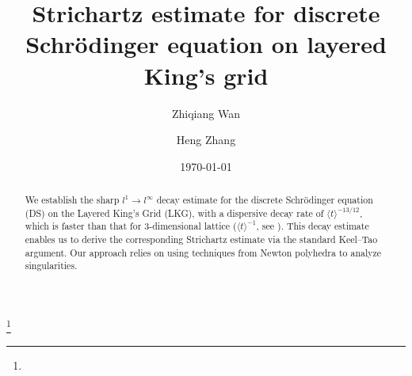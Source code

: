 \documentclass[12pt]{amsart}
\begin{document}
	
	
	\title{Strichartz estimate for discrete Schr\"odinger equation on layered King's grid}
	
	\author[Wan]{Zhiqiang Wan}
	\address{School of Mathematical Sciences, University of Science and Technology of China, Hefei}
	\author[Zhang]{Heng Zhang}
	\address{School of Mathematical Sciences, University of Science and Technology of China, Hefei}
	
	
	
	\keywords{}
	\subjclass[2020]{}
	\thanks{}
	
	
	\date{\today}
	
	
	\begin{abstract}
		We establish the sharp \( l^1 \to l^{\infty} \) decay estimate for the discrete Schr\"odinger equation (DS) on the Layered King's Grid (LKG), with a dispersive decay rate of \( \langle t \rangle^{-13/12} \), which is faster than that for $3$-dimensional lattice (\( \langle t \rangle^{-1} \), see \cite{SK05}). This decay estimate enables us to derive the corresponding Strichartz estimate via the standard Keel--Tao argument. Our approach relies on using techniques from Newton polyhedra to analyze singularities.%
		
	\end{abstract}

	\maketitle
	
\end{document}
